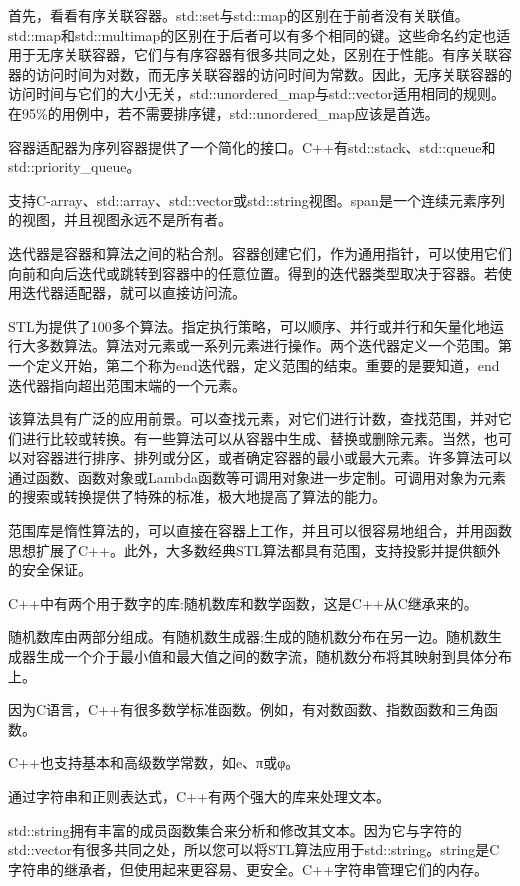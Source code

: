 首先，看看有序关联容器。std::set与std::map的区别在于前者没有关联值。std::map和std::multimap的区别在于后者可以有多个相同的键。这些命名约定也适用于无序关联容器，它们与有序容器有很多共同之处，区别在于性能。有序关联容器的访问时间为对数，而无序关联容器的访问时间为常数。因此，无序关联容器的访问时间与它们的大小无关，std::unordered\_map与std::vector适用相同的规则。在95\%的用例中，若不需要排序键，std::unordered\_map应该是首选。

容器适配器为序列容器提供了一个简化的接口。C++有std::stack、std::queue和std::priority\_queue。

支持C-array、std::array、std::vector或std::string视图。span是一个连续元素序列的视图，并且视图永远不是所有者。

迭代器是容器和算法之间的粘合剂。容器创建它们，作为通用指针，可以使用它们向前和向后迭代或跳转到容器中的任意位置。得到的迭代器类型取决于容器。若使用迭代器适配器，就可以直接访问流。

STL为提供了100多个算法。指定执行策略，可以顺序、并行或并行和矢量化地运行大多数算法。算法对元素或一系列元素进行操作。两个迭代器定义一个范围。第一个定义开始，第二个称为end迭代器，定义范围的结束。重要的是要知道，end迭代器指向超出范围末端的一个元素。

该算法具有广泛的应用前景。可以查找元素，对它们进行计数，查找范围，并对它们进行比较或转换。有一些算法可以从容器中生成、替换或删除元素。当然，也可以对容器进行排序、排列或分区，或者确定容器的最小或最大元素。许多算法可以通过函数、函数对象或Lambda函数等可调用对象进一步定制。可调用对象为元素的搜索或转换提供了特殊的标准，极大地提高了算法的能力。

范围库是惰性算法的，可以直接在容器上工作，并且可以很容易地组合，并用函数思想扩展了C++。此外，大多数经典STL算法都具有范围，支持投影并提供额外的安全保证。


C++中有两个用于数字的库:随机数库和数学函数，这是C++从C继承来的。

随机数库由两部分组成。有随机数生成器;生成的随机数分布在另一边。随机数生成器生成一个介于最小值和最大值之间的数字流，随机数分布将其映射到具体分布上。

因为C语言，C++有很多数学标准函数。例如，有对数函数、指数函数和三角函数。

C++也支持基本和高级数学常数，如e、π或φ。


通过字符串和正则表达式，C++有两个强大的库来处理文本。

std::string拥有丰富的成员函数集合来分析和修改其文本。因为它与字符的std::vector有很多共同之处，所以您可以将STL算法应用于std::string。string是C字符串的继承者，但使用起来更容易、更安全。C++字符串管理它们的内存。

